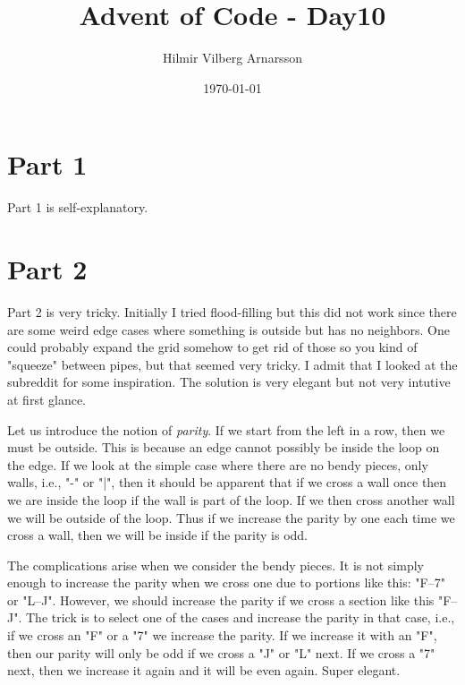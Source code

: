 \documentclass{article}
\begin{document}
\title{Advent of Code - Day10}
\author{Hilmir Vilberg Arnarsson}
\date{\today}

\maketitle
\clearpage
\setlength{\parskip}{1em}


\section*{Part 1}
Part 1 is self-explanatory.

\section*{Part 2}
Part 2 is very tricky. Initially I tried flood-filling but this did not work since there are some 
weird edge cases where something is outside but has no neighbors. One could probably expand the grid somehow
to get rid of those so you kind of "squeeze" between pipes, but that seemed very tricky. I admit that I
looked at the subreddit for some inspiration. The solution is very elegant but not very intutive at first glance.

Let us introduce the notion of \textit{parity}. If we start from the left in a row, then we must be outside.
This is because an edge cannot possibly be inside the loop on the edge. If we look at the simple case where
there are no bendy pieces, only walls, i.e., "-" or "|", then it should be apparent that if we cross a wall once
then we are inside the loop if the wall is part of the loop. If we then cross another wall we will be outside of 
the loop. Thus if we increase the parity by one each time we cross a wall, then we will be inside if the parity is odd.

The complications arise when we consider the bendy pieces. It is not simply enough to increase the parity when
we cross one due to portions like this: "F--7" or "L--J". However, we should increase the parity if we cross
a section like this "F--J". The trick is to select one of the cases and increase the parity in that case, i.e.,
if we cross an "F" or a "7" we increase the parity. If we increase it with an "F", then our parity will only be odd
if we cross a "J" or "L" next. If we cross a "7" next, then we increase it again and it will be even again. Super elegant.
\end{document}
